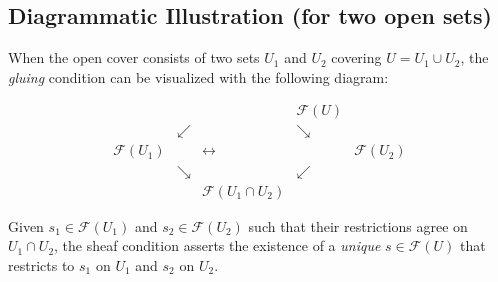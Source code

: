 \documentclass{article}
\begin{document}
\subsection*{Diagrammatic Illustration (for two open sets)}

When the open cover consists of two sets $U_1$ and $U_2$ covering $U=U_1 \cup U_2$, the \emph{gluing} condition can be visualized with the following diagram:

\[
\begin{array}{rcccl}
 & & & \mathcal{F}(U) &  \\
 & \swarrow & & \searrow & \\
\mathcal{F}(U_1) & & \longleftrightarrow & & \mathcal{F}(U_2) \\
 & \searrow & & \swarrow & \\
 & & \mathcal{F}(U_1 \cap U_2) & &
\end{array}
\]

Given $s_1 \in \mathcal{F}(U_1)$ and $s_2 \in \mathcal{F}(U_2)$ such that their restrictions agree on $U_1 \cap U_2$, the sheaf condition asserts the existence of a \emph{unique} $s \in \mathcal{F}(U)$ that restricts to $s_1$ on $U_1$ and $s_2$ on $U_2$.
\end{document}
